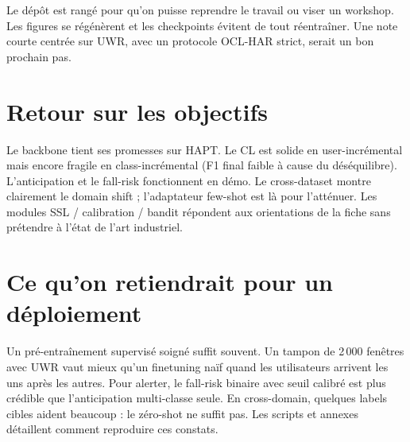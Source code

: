Le dépôt est rangé pour qu'on puisse reprendre le travail ou viser un
workshop. Les figures se régénèrent et les checkpoints évitent de tout
réentraîner. Une note courte centrée sur UWR, avec un protocole OCL-HAR
strict, serait un bon prochain pas.

\section{Retour sur les objectifs}

Le backbone tient ses promesses sur HAPT. Le CL est solide en user-incrémental
mais encore fragile en class-incrémental (F1 final faible à cause du
déséquilibre). L'anticipation et le fall-risk fonctionnent en démo. Le
cross-dataset montre clairement le domain shift ; l'adaptateur few-shot est
là pour l'atténuer. Les modules SSL / calibration / bandit répondent aux
orientations de la fiche sans prétendre à l'état de l'art industriel.

\section{Ce qu'on retiendrait pour un déploiement}

Un pré-entraînement supervisé soigné suffit souvent. Un tampon de 2\,000
fenêtres avec UWR vaut mieux qu'un finetuning naïf quand les utilisateurs
arrivent les uns après les autres. Pour alerter, le fall-risk binaire avec
seuil calibré est plus crédible que l'anticipation multi-classe seule. En
cross-domain, quelques labels cibles aident beaucoup : le zéro-shot ne
suffit pas. Les scripts et annexes détaillent comment reproduire ces
constats.
